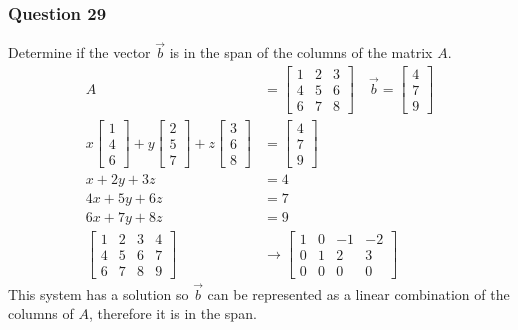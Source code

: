 \documentclass{math}
\begin{document}
\subsubsection*{Question 29}
Determine if the vector \( \vec{b} \) is in the span of the columns of the
matrix \( A \).
\begin{align*}
  A &= \begin{bmatrix}
    1 & 2 & 3 \\
    4 & 5 & 6 \\
    6 & 7 & 8
  \end{bmatrix} \quad \vec{b} = \begin{bmatrix}
    4 \\ 7 \\ 9
  \end{bmatrix} \\
  x\begin{bmatrix}1 \\ 4 \\ 6\end{bmatrix}+
    y\begin{bmatrix}2 \\ 5 \\ 7\end{bmatrix}+
    z\begin{bmatrix}3 \\ 6 \\ 8\end{bmatrix} &=
    \begin{bmatrix}4 \\ 7 \\ 9\end{bmatrix} \\
  x+2y+3z &= 4 \\
  4x+5y+6z &= 7 \\
  6x+7y+8z &= 9 \\
  \begin{bmatrix}
    1 & 2 & 3 & 4 \\
    4 & 5 & 6 & 7 \\
    6 & 7 & 8 & 9
  \end{bmatrix} &\to \begin{bmatrix}
    1 & 0 & -1 & -2 \\
    0 & 1 & 2 & 3 \\
    0 & 0 & 0 & 0
  \end{bmatrix}
\end{align*}
This system has a solution so \( \vec{b} \) can be represented as a linear
combination of the columns of \( A \), therefore it is in the span.
\end{document}
